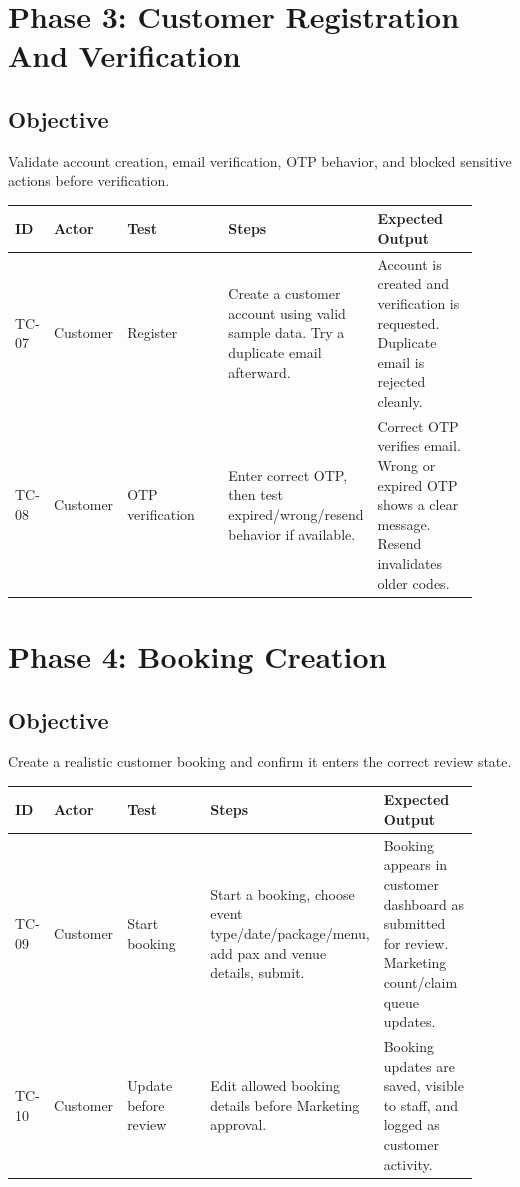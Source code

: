 \documentclass[11pt,a4paper]{article}
\begin{document}
\section{Phase 3: Customer Registration And Verification}
\subsection{Objective}
Validate account creation, email verification, OTP behavior, and blocked sensitive actions before verification.

\begin{longtable}{p{0.07\linewidth}p{0.13\linewidth}p{0.22\linewidth}p{0.28\linewidth}p{0.22\linewidth}}
\toprule
\textbf{ID} & \textbf{Actor} & \textbf{Test} & \textbf{Steps} & \textbf{Expected Output} \\
\midrule
TC-07 & Customer & Register & Create a customer account using valid sample data. Try a duplicate email afterward. & Account is created and verification is requested. Duplicate email is rejected cleanly. \\
TC-08 & Customer & OTP verification & Enter correct OTP, then test expired/wrong/resend behavior if available. & Correct OTP verifies email. Wrong or expired OTP shows a clear message. Resend invalidates older codes. \\
\bottomrule
\end{longtable}

\section{Phase 4: Booking Creation}
\subsection{Objective}
Create a realistic customer booking and confirm it enters the correct review state.

\begin{longtable}{p{0.07\linewidth}p{0.13\linewidth}p{0.22\linewidth}p{0.28\linewidth}p{0.22\linewidth}}
\toprule
\textbf{ID} & \textbf{Actor} & \textbf{Test} & \textbf{Steps} & \textbf{Expected Output} \\
\midrule
TC-09 & Customer & Start booking & Start a booking, choose event type/date/package/menu, add pax and venue details, submit. & Booking appears in customer dashboard as submitted for review. Marketing count/claim queue updates. \\
TC-10 & Customer & Update before review & Edit allowed booking details before Marketing approval. & Booking updates are saved, visible to staff, and logged as customer activity. \\
\bottomrule
\end{longtable}
\end{document}
